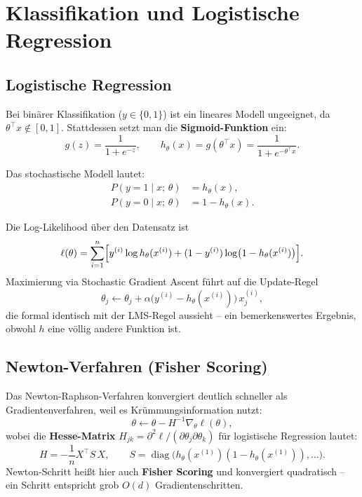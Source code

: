 \documentclass[11pt]{article}
\theoremstyle{csthm}
\theoremstyle{csdef}
\newcommand{\htheta}{h_\theta}
\newcommand{\T}{^\top}
\begin{document}
\section{Klassifikation und Logistische Regression}

\subsection{Logistische Regression}

Bei binärer Klassifikation ($y \in \{0,1\}$) ist ein lineares Modell
ungeeignet, da $\theta\T x \notin [0,1]$. Stattdessen setzt man die
\textbf{Sigmoid-Funktion} ein:
\begin{equation}
  g(z) = \frac{1}{1 + e^{-z}}, \qquad
  \htheta(x) = g(\theta\T x) = \frac{1}{1 + e^{-\theta\T x}}.
\end{equation}

Das stochastische Modell lautet:
\begin{align}
  P(y = 1 \mid x;\,\theta) &= \htheta(x), \\
  P(y = 0 \mid x;\,\theta) &= 1 - \htheta(x).
\end{align}

Die Log-Likelihood über den Datensatz ist
\begin{equation}
  \ell(\theta) = \sum_{i=1}^n
    \Bigl[y^{(i)}\log \htheta(x^{(i)})
      + (1 - y^{(i)})\log\bigl(1 - \htheta(x^{(i)})\bigr)\Bigr].
\end{equation}
Maximierung via Stochastic Gradient Ascent führt auf die Update-Regel
\begin{equation}
  \theta_j \leftarrow \theta_j
    + \alpha\bigl(y^{(i)} - \htheta(x^{(i)})\bigr)\, x_j^{(i)},
\end{equation}
die formal identisch mit der LMS-Regel aussieht -- ein bemerkenswertes
Ergebnis, obwohl $h$ eine völlig andere Funktion ist.

\subsection{Newton-Verfahren (Fisher Scoring)}

Das Newton-Raphson-Verfahren konvergiert deutlich schneller als
Gradientenverfahren, weil es Krümmungsinformation nutzt:
\begin{equation}
  \theta \leftarrow \theta - H^{-1} \nabla_\theta \ell(\theta),
\end{equation}
wobei die \textbf{Hesse-Matrix} $H_{jk} = \partial^2\ell / (\partial\theta_j
\partial\theta_k)$ für logistische Regression lautet:
\begin{equation}
  H = -\frac{1}{n} X\T S\, X, \qquad
  S = \operatorname{diag}\bigl(\htheta(x^{(1)})(1-\htheta(x^{(1)})),\ldots\bigr).
\end{equation}
Newton-Schritt heißt hier auch \textbf{Fisher Scoring} und konvergiert
quadratisch -- ein Schritt entspricht grob $O(d)$ Gradientenschritten.
\end{document}
